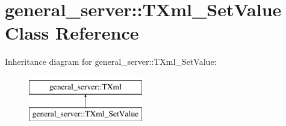 \hypertarget{classgeneral__server_1_1TXml__SetValue}{\section{general\-\_\-server\-:\-:\-T\-Xml\-\_\-\-Set\-Value \-Class \-Reference}
\label{classgeneral__server_1_1TXml__SetValue}
}
\-Inheritance diagram for general\-\_\-server\-:\-:\-T\-Xml\-\_\-\-Set\-Value\-:\begin{figure}[H]
\begin{center}
\leavevmode
\includegraphics[height=2.000000cm]{classgeneral__server_1_1TXml__SetValue}
\end{center}
\end{figure}
